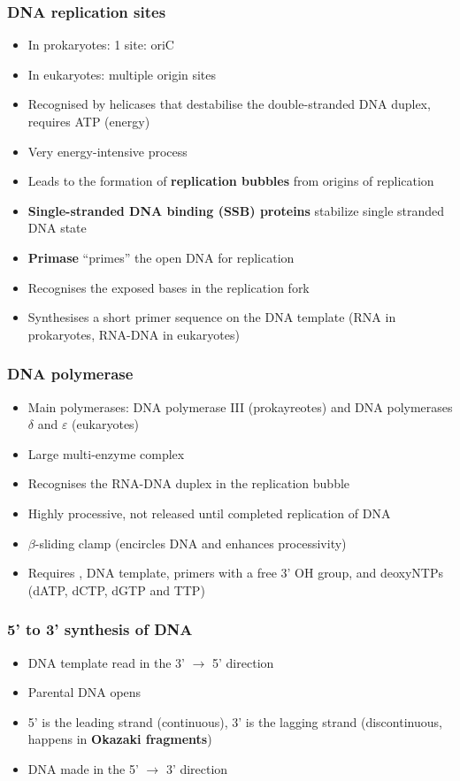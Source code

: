 \documentclass[letterpaper, 12pt]{article}
\begin{document}
\subsubsection*{DNA replication sites}
\begin{itemize}
\item In prokaryotes: 1 site: oriC
\item In eukaryotes: multiple origin sites
\item Recognised by helicases that destabilise the double-stranded DNA duplex, requires ATP (energy)
\item Very energy-intensive process
\item Leads to the formation of \textbf{replication bubbles} from origins of replication
\item \textbf{Single-stranded DNA binding (SSB) proteins} stabilize single stranded DNA state
\item \textbf{Primase} ``primes'' the open DNA for replication
\item Recognises the exposed bases in the replication fork
\item Synthesises a short primer sequence on the DNA template (RNA in prokaryotes, RNA-DNA in eukaryotes)
\end{itemize}

\subsubsection*{DNA polymerase}
\begin{itemize}
\item Main polymerases: DNA polymerase III (prokayreotes) and DNA polymerases $\delta$ and $\varepsilon$ (eukaryotes)
\item Large multi-enzyme complex
\item Recognises the RNA-DNA duplex in the replication bubble
\item Highly processive, not released until completed replication of DNA
\item $\beta$-sliding clamp (encircles DNA and enhances processivity)
\item Requires , DNA template, primers with a free 3' OH group, and deoxyNTPs (dATP, dCTP, dGTP and TTP)
\end{itemize}

\subsubsection*{5' to 3' synthesis of DNA}
\begin{itemize}
\item DNA template read in the 3' $\to$ 5' direction
\item Parental DNA opens
\item 5' is the leading strand (continuous), 3' is the lagging strand (discontinuous, happens in \textbf{Okazaki fragments})
\item DNA made in the 5' $\to$ 3' direction
\end{itemize}
\end{document}
